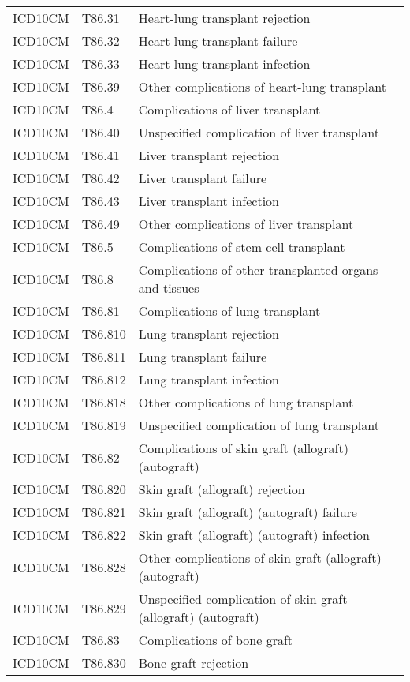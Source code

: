 \begin{longtable}{p{}p{}p{}}
  ICD10CM & T86.31 & Heart-lung transplant rejection \\ 
  ICD10CM & T86.32 & Heart-lung transplant failure \\ 
  ICD10CM & T86.33 & Heart-lung transplant infection \\ 
  ICD10CM & T86.39 & Other complications of heart-lung transplant \\ 
  ICD10CM & T86.4 & Complications of liver transplant \\ 
  ICD10CM & T86.40 & Unspecified complication of liver transplant \\ 
  ICD10CM & T86.41 & Liver transplant rejection \\ 
  ICD10CM & T86.42 & Liver transplant failure \\ 
  ICD10CM & T86.43 & Liver transplant infection \\ 
  ICD10CM & T86.49 & Other complications of liver transplant \\ 
  ICD10CM & T86.5 & Complications of stem cell transplant \\ 
  ICD10CM & T86.8 & Complications of other transplanted organs and tissues \\ 
  ICD10CM & T86.81 & Complications of lung transplant \\ 
  ICD10CM & T86.810 & Lung transplant rejection \\ 
  ICD10CM & T86.811 & Lung transplant failure \\ 
  ICD10CM & T86.812 & Lung transplant infection \\ 
  ICD10CM & T86.818 & Other complications of lung transplant \\ 
  ICD10CM & T86.819 & Unspecified complication of lung transplant \\ 
  ICD10CM & T86.82 & Complications of skin graft (allograft) (autograft) \\ 
  ICD10CM & T86.820 & Skin graft (allograft) rejection \\ 
  ICD10CM & T86.821 & Skin graft (allograft) (autograft) failure \\ 
  ICD10CM & T86.822 & Skin graft (allograft) (autograft) infection \\ 
  ICD10CM & T86.828 & Other complications of skin graft (allograft) (autograft) \\ 
  ICD10CM & T86.829 & Unspecified complication of skin graft (allograft) (autograft) \\ 
  ICD10CM & T86.83 & Complications of bone graft \\ 
  ICD10CM & T86.830 & Bone graft rejection \\ 

\end{longtable}
